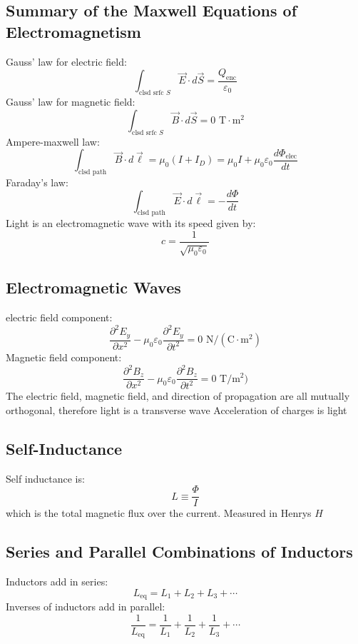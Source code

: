 \documentclass[twocolumn]{article}
\begin{document}
\subsection{Summary of the Maxwell Equations of Electromagnetism}
\begin{outline}
	\1 Gauss' law for electric field: \[\int_{\text{clsd srfc } S}\vec{E}\cdot d\vec{S}=\dfrac{Q_{\text{enc}}}{\varepsilon_0}\]
	\1 Gauss' law for magnetic field: \[\int_{\text{clsd srfc } S}\vec{B}\cdot d\vec{S}=0\text{ T}\cdot\text{m}^2\]
	\1 Ampere-maxwell law: \[\int_{\text{clsd path}}\vec{B}\cdot d\vec{\ell}=\mu_0(I+I_D)=\mu_0I+\mu_0\varepsilon_0\dfrac{d\Phi_{\text{elec}}}{dt}\]
	\1 Faraday's law: \[\int_{\text{clsd path}}\vec{E}\cdot d\vec{\ell}=-\dfrac{d\Phi}{dt}\]
	\1 Light is an electromagnetic wave with its speed given by: \[c=\dfrac{1}{\sqrt{\mu_0\varepsilon_0}}\]
\end{outline}
\subsection{Electromagnetic Waves}
\begin{outline}
	\1 electric field component: \[\dfrac{\partial^2E_y}{\partial x^2}-\mu_0\varepsilon_0\dfrac{\partial^2E_y}{\partial t^2}=0\text{ N}/(\text{C}\cdot\text{m}^2)\]
	\1 Magnetic field component: \[\dfrac{\partial^2B_z}{\partial x^2}-\mu_0\varepsilon_0\dfrac{\partial^2B_z}{\partial t^2}=0\text{ T}/\text{m}^2)\]
	\1 The electric field, magnetic field, and direction of propagation are all mutually orthogonal, therefore light is a transverse wave 
	\1 Acceleration of charges is light
\end{outline}
\subsection{Self-Inductance}
\begin{outline}
	\1 Self inductance is: \[L\equiv\dfrac{\Phi}{I}\] which is the total magnetic flux over the current. Measured in Henrys $H$

\end{outline}
\subsection{Series and Parallel Combinations of Inductors}
\begin{outline}
	\1 Inductors add in series: \[L_{\text{eq}}=L_1+L_2+L_3+\cdots\]
	\1 Inverses of inductors add in parallel: \[\dfrac{1}{L_{\text{eq}}}=\dfrac{1}{L_1}+\dfrac{1}{L_2}+\dfrac{1}{L_3}+\cdots\]
\end{outline}
\end{document}
